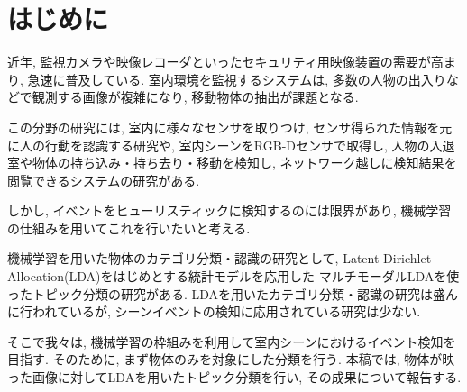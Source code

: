 \section{はじめに}

近年, 監視カメラや映像レコーダといったセキュリティ用映像装置の需要が高まり, 急速に普及している. 
室内環境を監視するシステムは, 多数の人物の出入りなどで観測する画像が複雑になり, 移動物体の抽出が課題となる. 
\par
この分野の研究には, 室内に様々なセンサを取りつけ, センサ得られた情報を元に人の行動を認識する研究\cite{森}や, 
室内シーンをRGB-Dセンサで取得し, 人物の入退室や物体の持ち込み・持ち去り・移動を検知し, 
ネットワーク越しに検知結果を閲覧できるシステムの研究\cite{ms}がある.
\par
しかし, イベントをヒューリスティックに検知するのには限界があり, 
機械学習の仕組みを用いてこれを行いたいと考える.
\par
機械学習を用いた物体のカテゴリ分類・認識の研究として, Latent Dirichlet Allocation(LDA)をはじめとする統計モデルを応用した
マルチモーダルLDAを使ったトピック分類の研究\cite{nagai2014}がある. 
LDAを用いたカテゴリ分類・認識の研究は盛んに行われているが, シーンイベントの検知に応用されている研究は少ない.
\par
そこで我々は, 機械学習の枠組みを利用して室内シーンにおけるイベント検知を目指す.
そのために, まず物体のみを対象にした分類を行う.
本稿では, 物体が映った画像に対してLDAを用いたトピック分類を行い, その成果について報告する.



